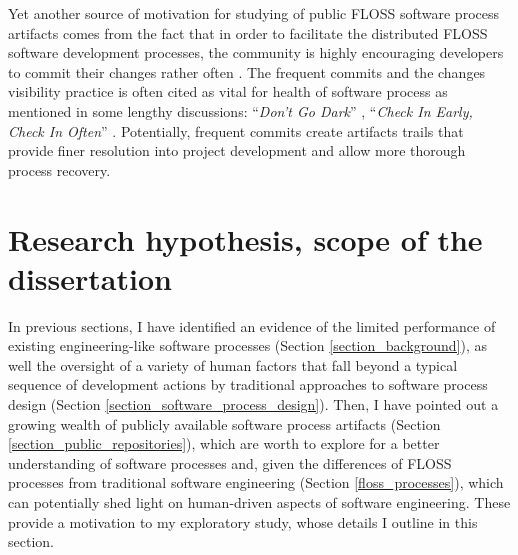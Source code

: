 Yet another source of motivation for studying of public FLOSS software process artifacts comes from the fact that 
in order to facilitate the distributed FLOSS software development processes, the community is highly encouraging
developers to commit their changes rather often \cite{so-checkin} \cite{git-best-practices1}.
The frequent commits and the changes visibility practice is often cited as vital for health of software 
process as mentioned in some lengthy discussions: ``\textit{Don't Go Dark}'' \cite{checkin-dgd-2008}, 
``\textit{Check In Early, Check In Often}'' \cite{checkin-ch-2012}. Potentially, frequent commits create artifacts 
trails that provide finer resolution into project development and allow more thorough process recovery.

%
%
\section{Research hypothesis, scope of the dissertation}\label{section_research_hypothesis}
In previous sections, I have identified an evidence of the limited performance of existing engineering-like 
software processes (Section \ref{section_background}),
 as well the oversight of a variety of human factors that fall beyond a typical sequence of development 
actions by traditional approaches to software process design (Section \ref{section_software_process_design}).
Then, I have pointed out a growing wealth of publicly available software process artifacts 
(Section \ref{section_public_repositories}), 
which are worth to explore for a better understanding of software processes and, 
given the differences of FLOSS processes from traditional software engineering (Section \ref{floss_processes}),
which can potentially shed light on human-driven aspects of software engineering. 
These provide a motivation to my exploratory study, whose details I outline in this section.

